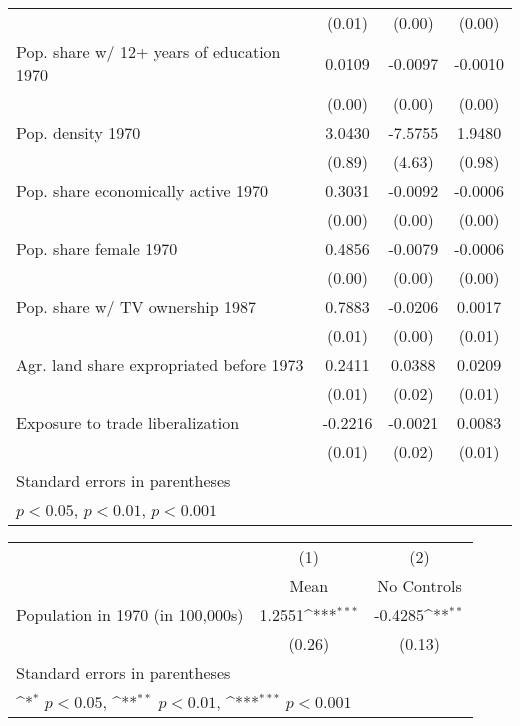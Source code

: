 {\begin{tabular}{l*{3}{c}}
                    &      (0.01)         &      (0.00)         &      (0.00)         \\
Pop. share w/ 12+ years of education 1970&      0.0109 &     -0.0097\sym{***}&     -0.0010         \\
                    &      (0.00)         &      (0.00)         &      (0.00)         \\
Pop. density 1970   &      3.0430 &     -7.5755         &      1.9480\sym{*}  \\
                    &      (0.89)         &      (4.63)         &      (0.98)         \\
Pop. share economically active 1970&      0.3031 &     -0.0092\sym{*}  &     -0.0006         \\
                    &      (0.00)         &      (0.00)         &      (0.00)         \\
Pop. share female 1970&      0.4856 &     -0.0079\sym{***}&     -0.0006         \\
                    &      (0.00)         &      (0.00)         &      (0.00)         \\
Pop. share w/ TV ownership 1987&      0.7883 &     -0.0206\sym{***}&      0.0017         \\
                    &      (0.01)         &      (0.00)         &      (0.01)         \\
Agr. land share expropriated before 1973&      0.2411 &      0.0388\sym{*}  &      0.0209         \\
                    &      (0.01)         &      (0.02)         &      (0.01)         \\
Exposure to trade liberalization&     -0.2216 &     -0.0021         &      0.0083         \\
                    &      (0.01)         &      (0.02)         &      (0.01)         \\
\hline\hline
\multicolumn{4}{l}{\footnotesize Standard errors in parentheses}\\
\multicolumn{4}{l}{\footnotesize \sym{*} \(p<0.05\), \sym{**} \(p<0.01\), \sym{***} \(p<0.001\)}\\
\end{tabular}
}
{
\def\sym#1{\ifmmode^{#1}\else\(^{#1}\)\fi}
\begin{tabular}{l*{2}{c}}
\hline\hline
                    &\multicolumn{1}{c}{(1)}&\multicolumn{1}{c}{(2)}\\
                    &\multicolumn{1}{c}{Mean}&\multicolumn{1}{c}{No Controls}\\
\hline
Population in 1970 (in 100,000s)&      1.2551\sym{***}&     -0.4285\sym{**} \\
                    &      (0.26)         &      (0.13)         \\
\hline\hline
\multicolumn{3}{l}{\footnotesize Standard errors in parentheses}\\
\multicolumn{3}{l}{\footnotesize \sym{*} \(p<0.05\), \sym{**} \(p<0.01\), \sym{***} \(p<0.001\)}\\
\end{tabular}
}
